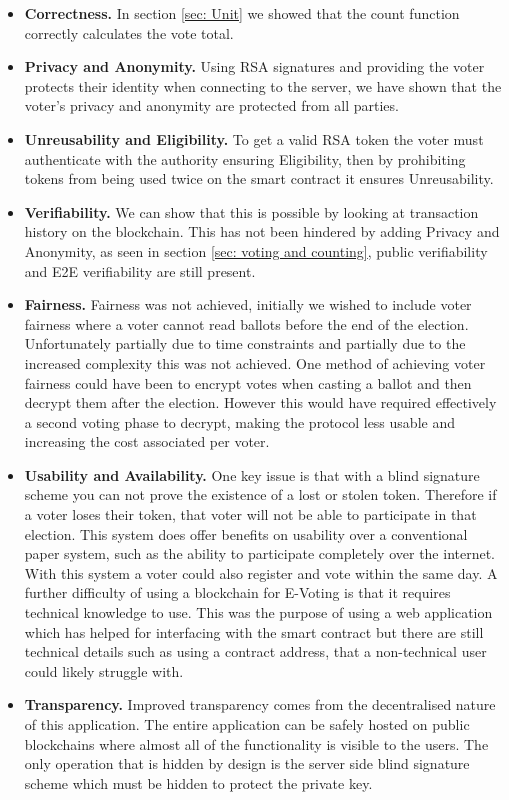 \documentclass{entcs}
\begin{document}
\begin{itemize}
    \item \textbf{Correctness.} In section \ref{sec: Unit} we showed that the count function correctly calculates the vote total. 
    \item \textbf{Privacy and Anonymity.} Using RSA signatures and providing the voter protects their identity when connecting to the server, we have shown that the voter's privacy and anonymity are protected from all parties. 
    \item \textbf{Unreusability and Eligibility.} To get a valid RSA token the voter must authenticate with the authority ensuring Eligibility, then by prohibiting tokens from being used twice on the smart contract it ensures Unreusability.
    \item \textbf{Verifiability.} We can show that this is possible by looking at transaction history on the blockchain. This has not been hindered by adding Privacy and Anonymity, as seen in section \ref{sec: voting and counting}, public verifiability and E2E verifiability are still present.
    \item \textbf{Fairness.} Fairness was not achieved, initially we wished to include voter fairness where a voter cannot read ballots before the end of the election. Unfortunately partially due to time constraints and partially due to the increased complexity this was not achieved. One method of achieving voter fairness could have been to encrypt votes when casting a ballot and then decrypt them after the election. However this would have required effectively a second voting phase to decrypt, making the protocol less usable and increasing the cost associated per voter.
    \item \textbf{Usability and Availability.} One key issue is that with a blind signature scheme you can not prove the existence of a lost or stolen token. Therefore if a voter loses their token, that voter will not be able to participate in that election. This system does offer benefits on usability over a conventional paper system, such as the ability to participate completely over the internet. With this system a voter could also register and vote within the same day. A further difficulty of using a blockchain for E-Voting is that it requires technical knowledge to use. This was the purpose of using a web application which has helped for interfacing with the smart contract but there are still technical details such as using a contract address, that a non-technical user could likely struggle with.
    \item \textbf{Transparency.} Improved transparency comes from the decentralised nature of this application. The entire application can be safely hosted on public blockchains where almost all of the functionality is visible to the users. The only operation that is hidden by design is the server side blind signature scheme which must be hidden to protect the private key.

\end{itemize}
\end{document}

